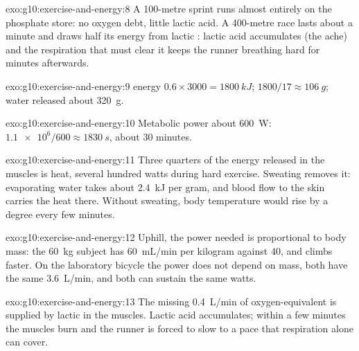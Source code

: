 \begin{solution}{exo:g10:exercise-and-energy:8}
A 100-metre sprint runs almost entirely on the phosphate store: no
oxygen debt, little lactic acid. A 400-metre race lasts about a
minute and draws half its energy from lactic : lactic acid
accumulates (the ache) and the respiration that must clear it keeps
the runner breathing hard for minutes afterwards.
\end{solution}

\begin{solution}{exo:g10:exercise-and-energy:9}
 energy $0.6 \times 3000 = \qty{1800}{kJ}$; 
$1800/17 \approx \qty{106}{g}$; water released about \qty{320}{g}.
\end{solution}

\begin{solution}{exo:g10:exercise-and-energy:10}
Metabolic power about \qty{600}{W}: $\num{1.1e6}/600 \approx
\qty{1830}{s}$, about 30 minutes.
\end{solution}

\begin{solution}{exo:g10:exercise-and-energy:11}
Three quarters of the energy released in the muscles is heat, several
hundred watts during hard exercise. Sweating removes it: evaporating
water takes about \qty{2.4}{kJ} per gram, and blood flow to the skin
carries the heat there. Without sweating, body temperature would rise
by a degree every few minutes.
\end{solution}

\begin{solution}{exo:g10:exercise-and-energy:12}
Uphill, the power needed is proportional to body mass: the
\qty{60}{kg} subject has \qty{60}{mL/min} per kilogram against
\num{40}, and climbs faster. On the laboratory bicycle the power
does not depend on mass, both have the same \qty{3.6}{L/min}, and
both can sustain the same watts.
\end{solution}

\begin{solution}{exo:g10:exercise-and-energy:13}
The missing \qty{0.4}{L/min} of oxygen-equivalent is supplied by
lactic  in the muscles. Lactic acid accumulates; within a
few minutes the muscles burn and the runner is forced to slow to a
pace that respiration alone can cover.
\end{solution}

